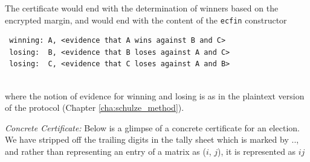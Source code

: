  The certificate would end with the determination of winners based
 on the encrypted margin, and would end with the content of the
 \texttt{ecfin} constructor

 {\small\begin{verbatim}
 winning: A, <evidence that A wins against B and C>
 losing:  B, <evidence that B loses against A and C>
 losing:  C, <evidence that C loses against A and B>
 \end{verbatim}}

 \mbox{}\\[-5ex]
 where the notion of evidence for winning and losing is as in the
 plaintext version of the protocol (Chapter \ref{cha:schulze_method}).  
 
 \noindent
 \textit{Concrete Certificate:} Below is a glimpse of a concrete certificate for an election. 
We have stripped off 
the trailing digits in the tally sheet which is marked by $..$, and rather 
 than representing an entry of a matrix as ($i$, $j$), it is represented as 
 $ij$

